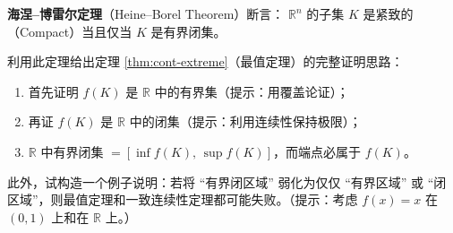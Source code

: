 \documentclass[lang=cn,11pt]{elegantbook}
\begin{document}
\begin{exercise}[紧致性定理的深入探讨]
\textbf{海涅--博雷尔定理}（Heine--Borel Theorem）断言：
$\mathbb{R}^n$ 的子集 $K$ 是紧致的（Compact）当且仅当 $K$ 是有界闭集。

利用此定理给出定理 \ref{thm:cont-extreme}（最值定理）的完整证明思路：
\begin{enumerate}
  \item[(1)] 首先证明 $f(K)$ 是 $\mathbb{R}$ 中的有界集（提示：用覆盖论证）；
  \item[(2)] 再证 $f(K)$ 是 $\mathbb{R}$ 中的闭集（提示：利用连续性保持极限）；
  \item[(3)] $\mathbb{R}$ 中有界闭集 $=[\inf f(K),\,\sup f(K)]$，而端点必属于 $f(K)$。
\end{enumerate}

此外，试构造一个例子说明：若将 ``有界闭区域'' 弱化为仅仅 ``有界区域'' 或 ``闭区域''，则最值定理和一致连续性定理都可能失败。（提示：考虑 $f(x)=x$ 在 $(0,1)$ 上和在 $\mathbb{R}$ 上。）
\end{exercise}
\end{document}
